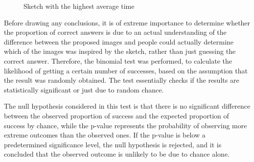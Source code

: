 \begin{figure}[!ht]
    \centering
     \quad
    \caption{Sketch with the highest average time}
    \label{fig:result sketch with highest average time}
\end{figure}

\noindent Before drawing any conclusions, it is of extreme importance to determine whether the proportion of correct answers is due to an actual understanding of the difference between the proposed images and people could actually determine which of the images was inspired by the sketch, rather than just guessing the correct answer. Therefore, the binomial test was performed, to calculate the likelihood of getting a certain number of successes, based on the assumption that the result was randomly obtained. The test essentially checks if the results are statistically significant or just due to random chance.

\noindent The null hypothesis considered in this test is that there is no significant difference between the observed proportion of success and the expected proportion of success by chance, while the p-value represents the probability of observing more extreme outcomes than the observed ones.
If the p-value is below a predetermined significance level, the null hypothesis is rejected, and it is concluded that the observed outcome is unlikely to be due to chance alone.


